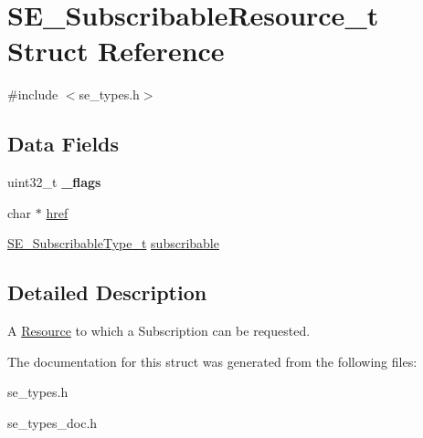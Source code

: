 \hypertarget{structSE__SubscribableResource__t}{}\section{S\+E\+\_\+\+Subscribable\+Resource\+\_\+t Struct Reference}
\label{structSE__SubscribableResource__t}


{\ttfamily \#include $<$se\+\_\+types.\+h$>$}

\subsection*{Data Fields}
\begin{DoxyCompactItemize}
\item 
uint32\+\_\+t {\bfseries \+\_\+flags}
\item 
char $\ast$ \hyperlink{group__SubscribableResource_ga441b3f58f676161e21090d41393461a0}{href}
\item 
\hyperlink{group__SubscribableType_ga5c41f553d369710ed34619266bf2551e}{S\+E\+\_\+\+Subscribable\+Type\+\_\+t} \hyperlink{group__SubscribableResource_gae36176e6f5160dca220b2e8047cdc241}{subscribable}
\end{DoxyCompactItemize}


\subsection{Detailed Description}
A \hyperlink{structResource}{Resource} to which a Subscription can be requested. 

The documentation for this struct was generated from the following files\+:\begin{DoxyCompactItemize}
\item 
se\+\_\+types.\+h\item 
se\+\_\+types\+\_\+doc.\+h\end{DoxyCompactItemize}
